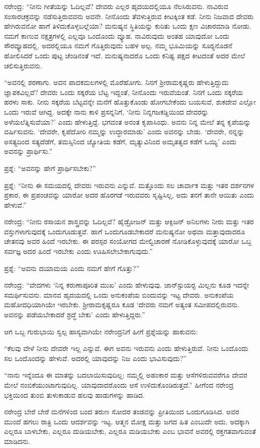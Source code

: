 ನರೇಂದ್ರ: “ನೀನು ಗೀತೆಯನ್ನು ಓದಿಲ್ಲವೆ? ದೇವರು ಎಲ್ಲರ ಹೃದಯದಲ್ಲಿಯೂ ನೆಲಸಿರುವನು. ನಾವಿರುವ ಸಂಸಾರಚಕ್ರವನ್ನು ನಡೆಸುತ್ತಿರುವವನು ಅವನೇ. ನೀನೊಂದು ತೆವಳುತ್ತಿರುವ ಕೀಟಕ್ಕಿಂತ ಕಡೆ. ನೀನು ನಿಜವಾದ ದೇವರು ಹೇಗಿರುವನೋ ಹಾಗೆ ತಿಳಿದುಕೊಳ್ಳಬಲ್ಲೆಯಾ? ಮನುಷ್ಯನ ಸ್ಥಿತಿಯನ್ನು ಕುರಿತು ಒಂದು ಕ್ಷಣ ವಿಚಾರಮಾಡಿ ನೋಡು. ನಮಗೆ ಕಾಣುವ ನಕ್ಷತ್ರಗಳಲ್ಲಿ ಎಲ್ಲವೂ ಒಂದೊಂದು ವ್ಯೂಹ. ನಾವಿರುವುದು ಅಂತಹ ಯಾವುದೋ ಒಂದು ಸೌರವ್ಯೂಹದಲ್ಲಿ. ಅದರಲ್ಲಿಯೂ ನಮಗೆ ಗೊತ್ತಿರುವುದು ಬಹಳ ಅಲ್ಪ. ನಮ್ಮ ಭೂಮಿಯನ್ನು ಸೂರ‍್ಯನೊಡನೆ ಹೋಲಿಸಿದರೆ ಒಂದು ಪುಟ್ಟ ಚೆಂಡಿನಂತೆ ಇದೆ. ಮನುಷ್ಯನಾದರೊ ಒಂದು ಕನಿಷ್ಟ ಪಕ್ಷದ ಕೀಟದಂತೆ ಅದರ ಮೇಲೆ ಚಲಿಸುತ್ತಿರುವನು.

“ಅವನಲ್ಲಿ ಶರಣಾಗು. ಅವನ ಪಾದಕಮಲಗಳಲ್ಲಿ ಮೊರೆಹೋಗು. ನಿನಗೆ ಶ‍್ರೀರಾಮಕೃಷ್ಣರು ಹೇಳುತ್ತಿದ್ದುದು ಜ್ಞಾಪಕವಿಲ್ಲವೆ? ದೇವರು ಒಂದು ಸಕ್ಕರೆಯ ಬೆಟ್ಟ ಇದ್ದಂತೆ, ನೀನೊಂದು ಇರುವೆಯಂತೆ. ನಿನಗೆ ಒಂದು ಸಕ್ಕರೆಯ ಹರಳು ಸಾಕು. ನೀನು ಸಕ್ಕರೆಯ ಬೆಟ್ಟವನ್ನೇ ಮನೆಗೆ ಹೊತ್ತುಕೊಂಡು ಹೋಗಬೇಕೆಂದು ಬಯಸುವೆ, ಶುಕದೇವ ಎಲ್ಲೋ ಒಂದು ಇರುವೆ ಆಗಿದ್ದ. ಅದಕ್ಕೇ ನಾನು ಕಾಳಿ ಪ್ರಸನ್ನನಿಗೆ, ‘ನೀನು ನಿನ್ನ\break ಗಜಕಡ್ಡಿಯಿಂದ ದೇವರನ್ನು ಅಳೆಯಲೆತ್ನಿಸುವೆಯಾ?’ ಎಂದು ಹೇಳುತ್ತಿದ್ದೆ. ಭಗವಂತ ಅನಂತ ಕೃಪಾಸಿಂಧು. ಅವನು ನಿನ್ನ ಮೇಲೆ ತನ್ನ ಕೃಪೆಯನ್ನು ವರ್ಷಿಸುವನು. ‘ದೇವರೇ, ಕೃಪೆದೋರಿ ನಮ್ಮನ್ನು ಉದ್ಧಾರಮಾಡು’ ಎಂದು ಅವನನ್ನು ಬೇಡು. ‘ದೇವರೇ, ನನ್ನನ್ನು ಅಸತ್ಯದಿಂದ ಸತ್ಯದೆಡೆಗೆ, ತಮಸ್ಸಿನಿಂದ ಜ್ಯೋತಿಯ ಕಡೆಗೆ, ಮೃತ್ಯುವಿನಿಂದ ಅಮೃತತ್ವದ ಕಡೆಗೆ ಒಯ್ಯಿ’ ಎಂದು ಅವನನ್ನು ಪ್ರಾರ್ಥಿಸು.”

ಪ್ರಶ್ನೆ: “ಅವನನ್ನು ಹೇಗೆ ಪ್ರಾರ್ಥಿಸಬೇಕು?”

ಪ್ರಶ್ನೆ: “ನೀನು ಈ ಸಮಯದಲ್ಲಿ ದೇವರು ಇರುವನು ಎನ್ನುವೆ. ಮತ್ತೊಂದು ಸಲ ಚಾರ್ವಾಕ ಮತ್ತು ಇತರ ದರ್ಶನಗಳ ಪ್ರಕಾರ, ಈ ಪ್ರಪಂಚವನ್ನು ಯಾರೋ ಅದರ ಹೊರಗಡೆ ಇರುವವರು ಸೃಷ್ಟಿಸಿಲ್ಲ, ಅದು ತನಗೆ ತಾನೇ ಆಯಿತು ಎಂದು ಹೇಳುವೆ.”

ನರೇಂದ್ರ: “ನೀನು ರಸಾಯನ ಶಾಸ್ತ್ರವನ್ನು ಓದಿಲ್ಲವೆ? ಹೈಡ್ರೋಜನ್ ಮತ್ತು ಆಕ್ಸಿಜನ್ ಅನಿಲಗಳು ನೀರು ಮತ್ತು ಇತರ ವಸ್ತುಗಳಾಗುವುದಕ್ಕೆ ಒಂದುಗೂಡುತ್ತವೆ. ಹಾಗೆ ಒಂದುಗೂಡಬೇಕಾದರೆ ಮನುಷ್ಯನೋ ಅಥವಾ ಮತ್ತಾವುದಾದರೂ ಚೇತನವು ಅವರ ಹಿಂದೆ ಇರಬೇಕು. ಈ ಪರಸ್ಪರ ಸಂಯೋಗದ ಮೇಲ್ವಿಚಾರಣೆ ನೋಡಿಕೊಳ್ಳುವುದಕ್ಕೆ ಯಾರೋ ಒಬ್ಬ ಸರ್ವಜ್ಞ ಅದರ ಹಿಂದೆ ಇರಬೇಕು ಎಂದು ಊಹಿಸಲೇಬೇಕಾಗುವುದು.”

ಪ್ರಶ್ನೆ: “ಅವನು ದಯಾಮಯ ಎಂದು ನಮಗೆ ಹೇಗೆ ಗೊತ್ತು?”

ನರೇಂದ್ರ: “ವೇದಗಳು ‘ನಿನ್ನ ಕರುಣಾಪೂರಿತ ಮುಖ’ ಎಂದು ಹೇಳುವುವು. ಜಾನ್‍ಸ್ಟುಯರ‍್ಟ ಮಿಲ್ಲನು ಕೂಡ ಇದನ್ನೇ ಸಮರ್ಥಿಸುವನು. ಮಾನವ ಹೃದಯದಲ್ಲಿ ಒಂದು ಅನುಕಂಪೆಯ ಬಿಂದುವನ್ನು ಇಟ್ಟ ದೇವರು. ಅನುಕಂಪೆಯ ಮಹೋದಧಿಯಾಗಿಯೇ ಇರಬೇಕು. ಶ‍್ರೀರಾಮಕೃಷ್ಣರೂ ಕೂಡ ‘ದೇವರು ನಮಗೆ ಅತ್ಯಂತ ಸಮೀಪದಲ್ಲಿರುವನು. ಅವನನ್ನು ಪಡೆಯಬೇಕಾದರೆ ಶ್ರದ್ಧೆ ಬೇಕು’ ಎಂದು ಹೇಳುತ್ತಿದ್ದರು.”

ಆಗ ಒಬ್ಬ ಗುರುಭಾಯಿ ಸ್ವಲ್ಪ ಹಾಸ್ಯವಾಗಿಯೇ ನರೇಂದ್ರನಿಗೆ ಹೀಗೆ ಪ್ರಶ್ನೆಯನ್ನು ಹಾಕುವನು:

“ಕೆಲವು ವೇಳೆ ನೀನು ದೇವರೇ ಇಲ್ಲ ಎನ್ನುವೆ. ಈಗ ಅವನು ಇರುವನು ಎಂದು ಹೇಳುತ್ತಿರುವೆ. ನೀನು ಒಂದೊಂದು ಸಲ ಒಂದೊಂದನ್ನು ಹೇಳುವೆ. ಅದರಲ್ಲಿ ಯಾವುದನ್ನು ನಿಜ ಎಂದು ಭಾವಿಸುವುದು?”

“ನಾನು ಇನ್ನೆಂದೂ ಈ ಮಾತನ್ನು ಬದಲಾಯಿಸುವುದಿಲ್ಲ: ನಮ್ಮಲ್ಲಿ ಅಹಂಕಾರ ಮತ್ತು ಆಸೆಗಳಿರುವವರೆಗೂ ದೇವರ ಮೇಲೆ ನಂಬಿಕೆಯುಂಟಾಗುವುದಿಲ್ಲ. ಯಾವುದಾದರೊಂದು ಆಸೆ ಉಳಿದುಕೊಂಡಿರುತ್ತದೆ.” ಹೀಗೆಂದ ನರೇಂದ್ರ ಭಕ್ತಿಯಿಂದ ತುಂಬಿ ತುಳುಕಾಡುವ ಹಲವು ಹಾಡುಗಳನ್ನು ಹಾಡಿದ.

ನರೇಂದ್ರ ಬೇರೆ ಬೇರೆ ಮನೆಗಳಿಂದ ಬಂದ ತರುಣ ಸೋದರ ತಂಡವನ್ನು ಪ್ರೀತಿಯಿಂದ ಒಂದುಗೂಡಿಸಿದ. ಅವರ ಮುಂದೆ ಹಗಲು ರಾತ್ರಿ ಒಂದು ಆದರ್ಶವನ್ನು ಇಟ್ಟ. ಆತ್ಮನ ಮೋಕ್ಷ ಮತ್ತು ಜಗದ ಹಿತ ಎಂಬುದೇ ಅದು. ಅದಕ್ಕಾಗಿ ಎಲ್ಲರೂ ಬಾಳಬೇಕು, ಎಲ್ಲರೂ ದುಡಿಯಬೇಕು, ಎಲ್ಲರೂ ಮಡಿಯಬೇಕು ಎಂಬ ಭಾವನೆ ಅವರಲ್ಲಿ ರಕ್ತಗತವಾಗುವಂತೆ ಮಾಡಿದನು.

